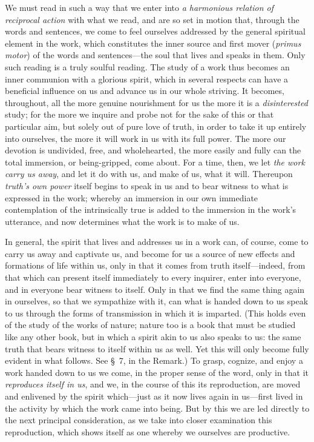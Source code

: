 \documentclass[12pt,a4paper]{book}
\begin{document}
We must read in such a way that we enter into \emph{a harmonious relation of
reciprocal action} with what we read, and are so set in motion that, through the
words and sentences, we come to feel ourselves addressed by the general
spiritual element in the work, which constitutes the inner source and first
mover (\textit{primus motor}) of the words and sentences---the soul that lives
and speaks in them. Only such reading is a truly soulful reading. The study of a
work thus becomes an inner communion with a glorious spirit, which in several
respects can have a beneficial influence on us and advance us in our whole
striving. It becomes, throughout, all the more genuine nourishment for us the
more it is a \emph{disinterested} study; for the more we inquire and probe not
for the sake of this or that particular aim, but solely out of pure love of
truth, in order to take it up entirely into ourselves, the more it will work in
us with its full power. The more our devotion is undivided, free, and
wholehearted, the more easily and fully can the total immersion, or
being-gripped, come about. For a time, then, we let \emph{the work carry us away}, and
let it do with us, and make of us, what it will. Thereupon \emph{truth's own power}
itself begins to speak in us and to bear witness to what is expressed in the
work; whereby an immersion in our own immediate contemplation of the
intrinsically true is added to the immersion in the work's utterance, and now
determines what the work is to make of us.

In general, the spirit that lives and addresses us in a work can, of course,
come to carry us away and captivate us, and become for us a source of new
effects and formations of life within us, only in that it comes from truth
itself---indeed, from that which can present itself immediately to every
inquirer, enter into everyone, and in everyone bear witness to itself. Only in
that we find the same thing again in ourselves, so that we sympathize with it,
can what is handed down to us speak to us through the forms of transmission in
which it is imparted. (This holds even of the study of the works of nature;
nature too is a book that must be studied like any other book, but in which a
spirit akin to us also speaks to us: the same truth that bears witness to itself
within us as well. Yet this will only become fully evident in what follows. See
\S~7, in the Remark.) To grasp, cognize, and enjoy a work handed down to us we
come, in the proper sense of the word, only in that it \emph{reproduces itself
in us}, and we, in the course of this its reproduction, are moved and enlivened
by the spirit which---just as it now lives again in us---first lived in the
activity by which the work came into being. But by this we are led directly to
the next principal consideration, as we take into closer examination this
reproduction, which shows itself as one whereby we ourselves are productive.
\end{document}
